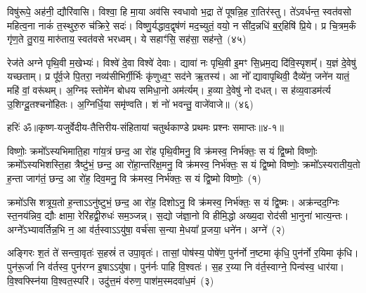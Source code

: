 विषु॑रूपे॒ अह॑नी॒ द्यौरि॑वासि। विश्वा॒ हि मा॒या अव॑सि स्वधावो भ॒द्रा ते॑ पूषन्नि॒ह रा॒तिर॑स्तु। ते॑\-ऽवर्धन्त॒ स्वत॑वसो महित्व॒ना नाकं॑ त॒स्थुरु॒रु च॑क्रिरे॒ सदः॑। विष्णु॒र्यद्धाव॒द्वृष॑णं मद॒च्युतं॒ वयो॒ न सी॑द॒न्नधि॑ ब॒र्॒\mbox{}हिषि॑ प्रि॒ये। प्र चि॒त्रम॒र्कं गृ॑ण॒ते तु॒राय॒ मारु॑ताय॒ स्वत॑वसे भरध्वम्। ये सहाꣳ॑सि॒ सह॑सा॒ सह॑न्ते॒~(४५)\ip

रेज॑ते अग्ने पृथि॒वी म॒खेभ्यः॑। विश्वे॑ दे॒वा विश्वे॑ देवाः। द्यावा॑ नः पृथि॒वी इ॒मꣳ सि॒ध्रम॒द्य दि॑वि॒स्पृशम्᳚। य॒ज्ञं दे॒वेषु॑ यच्छताम्। प्र पू᳚र्व॒जे पि॒तरा॒ नव्य॑सीभिर्गी॒र्भिः कृ॑णुध्व॒ꣳ॒ सद॑ने ऋ॒तस्य॑। आ नो᳚ द्यावा\-पृथिवी॒ दैव्ये॑न॒ जने॑न यातं॒ महि॑ वां॒ वरू॑थम्। अ॒ग्निꣴ स्तोमे॑न बोधय समिधा॒नो अम॑र्त्यम्। ह॒व्या दे॒वेषु॑ नो दधत्। स ह॑व्य॒वाडम॑र्त्य उ॒शिग्दू॒तश्चनो॑हितः। अ॒ग्निर्धि॒या समृ॑ण्वति। शं नो॑ भवन्तु॒ वाजे॑वाजे॥~(४६)\ip

{\anuvakamend[{पू॒रु॒ष॒त्वता॑ यज॒तन्ते॑ अ॒न्यथ्सह॑न्ते॒ चनो॑हितो॒\-ऽष्टौ च॑}]}%

{हरिः॑ ॐ}{॥कृष्ण-यजुर्वेदीय-तैत्तिरीय-संहितायां चतुर्थकाण्डे प्रथमः प्रश्नः समाप्तः॥४-१॥}



\setcounter{anuvakam}{0}
विष्णोः॒ क्रमो᳚\-ऽस्यभिमाति॒हा गा॑य॒त्रं छन्द॒ आ रो॑ह पृथि॒वीमनु॒ वि क्र॑मस्व॒ निर्भ॑क्तः॒ स यं द्वि॒ष्मो विष्णोः॒ क्रमो᳚\-ऽस्यभिशस्ति॒हा त्रैष्टु॑भं॒ छन्द॒ आ रो॑हा॒न्तरि॑क्ष॒मनु॒ वि क्र॑मस्व॒ निर्भ॑क्तः॒ स यं द्वि॒ष्मो विष्णोः॒ क्रमो᳚\-ऽस्यरातीय॒तो ह॒न्ता जाग॑तं॒ छन्द॒ आ रो॑ह॒ दिव॒मनु॒ वि क्र॑मस्व॒ निर्भ॑क्तः॒ स यं द्वि॒ष्मो विष्णोः॒~(१)\ip

क्रमो॑\-ऽसि शत्रूय॒तो ह॒न्ताऽऽनु॑ष्टुभं॒ छन्द॒ आ रो॑ह॒ दिशो\-ऽनु॒ वि क्र॑मस्व॒ निर्भ॑क्तः॒ स यं द्वि॒ष्मः। अक्र॑न्दद॒ग्निः स्त॒नय॑न्निव॒ द्यौः क्षामा॒ रेरि॑हद्वी॒रुधः॑ सम॒ञ्जन्न्। स॒द्यो ज॑ज्ञा॒नो वि हीमि॒द्धो अख्य॒दा रोद॑सी भा॒नुना॑ भात्य॒न्तः। अग्ने᳚\-ऽभ्यावर्तिन्न॒भि न॒ आ व॑र्त॒स्वाऽऽयु॑षा॒ वर्च॑सा स॒न्या मे॒धया᳚ प्र॒जया॒ धने॑न। अग्ने॑~(२)\ip

अङ्गिरः श॒तं ते॑ सन्त्वा॒वृतः॑ स॒हस्रं॑ त उपा॒वृतः॑। तासां॒ पोष॑स्य॒ पोषे॑ण॒ पुन॑र्नो न॒ष्टमा कृ॑धि॒ पुन॑र्नो र॒यिमा कृ॑धि। पुन॑रू॒र्जा नि व॑र्तस्व॒ पुन॑रग्न इ॒षा\-ऽऽ\-यु॑षा। पुन॑र्नः पाहि वि॒श्वतः॑। स॒ह र॒य्या नि व॑र्त॒स्वाग्ने॒ पिन्व॑स्व॒ धार॑या। वि॒श्वफ्स्नि॑या वि॒श्वत॒स्परि॑। उदु॑त्त॒मं व॑रुण॒ पाश॑म॒स्मदवा॑ध॒मं~(३)\ip

